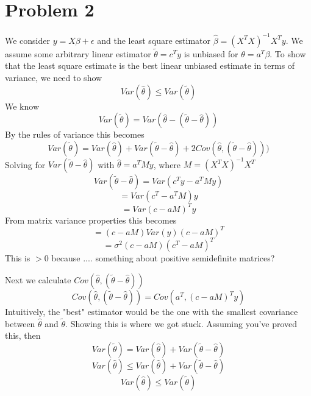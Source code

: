 \section*{Problem 2}
We consider $y=X\beta + \epsilon$ and the least square estimator $\hat{\beta} = (X^TX)^{-1}X^Ty$. We assume some arbitrary linear estimator $\tilde{\theta} = c^Ty$ is unbiased for $\theta = a^T\beta$. To show that the least square estimate is the best linear unbiased estimate in terms of variance, we need to show
\[ Var(\hat{\theta}) \leq  Var(\tilde{\theta}) \]
We know 
\[ Var(\tilde{\theta}) = Var(\hat{\theta} - (\tilde{\theta} - \hat{\theta})) \]
By the rules of variance this becomes
\[ Var(\tilde{\theta}) = Var(\hat{\theta}) + Var(\tilde{\theta} - \hat{\theta}) + 2Cov(\hat{\theta},(\tilde{\theta} - \hat{\theta}))) \]
Solving for $Var(\tilde{\theta} - \hat{\theta})$ with $\hat{\theta} = a^TMy$, where $M = (X^TX)^{-1}X^T$ 
\[ Var(\tilde{\theta} - \hat{\theta}) = Var(c^Ty - a^TMy) \]
\[  = Var(c^T - a^TM)y \]
\[  = Var(c - aM)^Ty \]
From matrix variance properties this becomes
\[  = (c - aM)Var(y)(c - aM)^T \]
\[  = \sigma^2(c - aM)(c^T - aM)^T \]
This is $> 0$ because .... something about positive semidefinite matrices?\newline

\noindent Next we calculate $Cov(\hat{\theta},(\tilde{\theta} - \hat{\theta}))$
\[ Cov(\hat{\theta},(\tilde{\theta} - \hat{\theta})) = Cov(a^T,(c-aM)^Ty)  \]
\noindent Intuitively, the "best" estimator would be the one with the smallest covariance between $\hat{\theta}$ and $\tilde{\theta}$. Showing this is where we got stuck.\newline 
\noindent Assuming you've proved this, then
\[Var(\tilde{\theta})  = Var(\hat{\theta}) + Var(\tilde{\theta} - \hat{\theta}) \]
\[Var(\hat{\theta})  \leq Var(\hat{\theta}) + Var(\tilde{\theta} - \hat{\theta}) \]
\[ Var(\hat{\theta}) \leq  Var(\tilde{\theta}) \]
